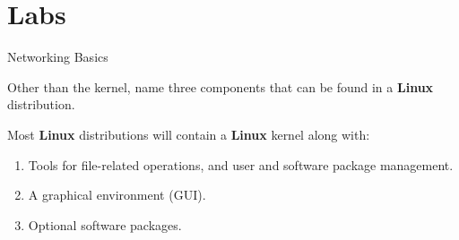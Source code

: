 \clearpage\section{Labs}\begin{Lab}

\begin{exe} {Networking Basics}

   Other than the kernel, name three components that can be
   found in a \textbf{Linux} distribution.


      Most \textbf{Linux} distributions will contain a
      \textbf{Linux} kernel along with:
      \begin{enumerate}
         \item
         Tools for file-related operations, and user and
         software package management.
         \item
         A graphical environment (GUI).
         \item
         Optional software packages.
      \end{enumerate}
\end{exe}
\end{Lab}
